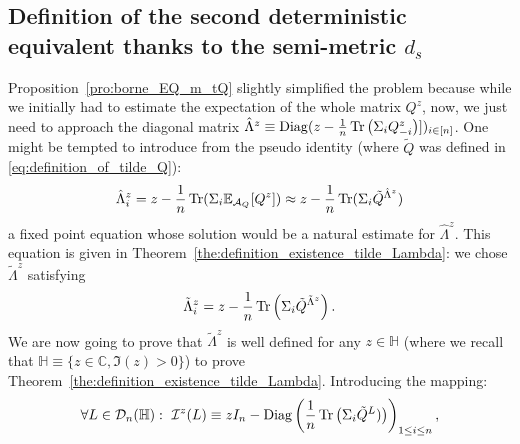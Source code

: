 \documentclass[a4papaer, titlepage]{book}
\begin{document}
\subsection{Definition of the second deterministic equivalent thanks to the semi-metric $d_s$}

Proposition~\ref{pro:borne_EQ_m_tQ} slightly simplified the problem because while we initially had to estimate the expectation of the whole matrix $Q^z$, now, we just need to approach the diagonal matrix $\hat \Lambda^z \equiv \operatorname{Diag}(z - \frac{1}{n}\operatorname{Tr} \left( \Sigma_i Q_{-i}^z \right)])_{i \in [n]}$. 
One might be tempted to introduce from the pseudo identity (where $\tilde Q$ was defined in \eqref{eq:definition_of_tilde_Q}):
\begin{align}\label{eq:fixed_point_equation_Delta}
  \hat \Lambda_i^z 
  = z-  \frac{1}{n} \operatorname{Tr}(\Sigma_i \mathbb E_{\mathcal A_Q} [Q^{z}])
  \approx z-  \frac{1}{n} \operatorname{Tr}(\Sigma_i \tilde Q^{\hat \Lambda^z})
\end{align}
a fixed point equation whose solution would be a natural estimate for $\hat \Lambda^z$. This equation is given in Theorem~\ref{the:definition_existence_tilde_Lambda}: we chose $\tilde \Lambda^z$ satisfying
\begin{align*}
  \tilde \Lambda_i^z = z - \frac{1}{n} \operatorname{Tr} \left(\Sigma_i \tilde Q^{\tilde \Lambda^z}\right).
\end{align*}
We are now going to prove that $\tilde \Lambda^z$ is well defined for any $z \in \mathbb H$ (where we recall that $\mathbb H \equiv \{z \in \mathbb C, \Im(z) >0\}$) to prove Theorem~\ref{the:definition_existence_tilde_Lambda}.
Introducing the mapping:
\begin{align*}
  \forall L \in \mathcal D_n(\mathbb H): \  \mathcal I^z(L) \equiv zI_ n - \operatorname{Diag} \left(\frac{1}{n}\operatorname{Tr}\left(\Sigma_i \tilde Q^L)\right)  \right)_{1\leq i \leq n},
\end{align*}
\end{document}
